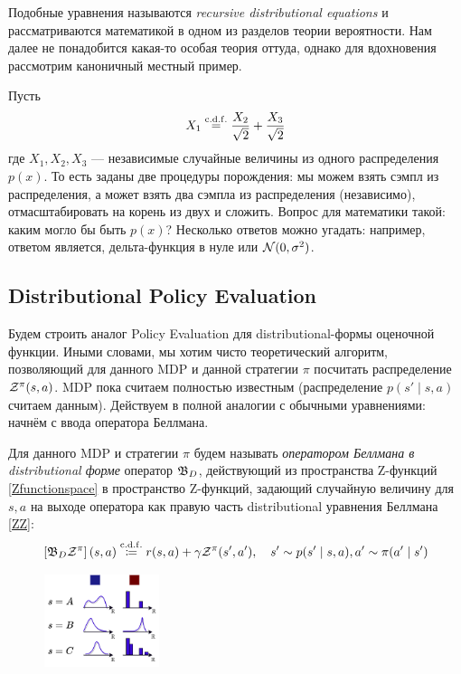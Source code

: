 Подобные уравнения называются \emph{recursive distributional equations} и рассматриваются математикой в одном из разделов теории вероятности. Нам далее не понадобится какая-то особая теория оттуда, однако для вдохновения рассмотрим каноничный местный пример. 
\begin{example}
Пусть
$$X_1 \mathrel{\stackrel{\mathrm{c.d.f.}}=} \frac{X_2}{\sqrt{2}} + \frac{X_3}{\sqrt{2}}$$
где $X_1, X_2, X_3$ --- независимые случайные величины из одного распределения $p(x)$. То есть заданы две процедуры порождения: мы можем взять сэмпл из распределения, а может взять два сэмпла из распределения (независимо), отмасштабировать на корень из двух и сложить. Вопрос для математики такой: каким могло бы быть $p(x)$? Несколько ответов можно угадать: например, ответом является, дельта-функция в нуле или $\mathcal{N}(0, \sigma^2)$.
\end{example}

\subsection{Distributional Policy Evaluation}

Будем строить аналог Policy Evaluation для distributional-формы оценочной функции. Иными словами, мы хотим чисто теоретический алгоритм, позволяющий для данного MDP и данной стратегии $\pi$ посчитать распределение $\mathcal{Z}^\pi(s, a)$. MDP пока считаем полностью известным (распределение $p(s' \mid s, a)$ считаем данным). Действуем в полной аналогии с обычными уравнениями: начнём с ввода оператора Беллмана.

\begin{definition}
Для данного MDP и стратегии $\pi$ будем называть \emph{оператором Беллмана в distributional форме} оператор $\mathfrak{B}_D$, действующий из пространства Z-функций \eqref{Zfunctionspace} в пространство Z-функций, задающий случайную величину для $s, a$ на выходе оператора как правую часть distributional уравнения Беллмана \eqref{ZZ}:
$$\left[\mathfrak{B}_D \mathcal{Z}^\pi\right](s, a) \mathrel{\stackrel{\mathrm{c.d.f.}}\coloneqq} r(s, a) + \gamma \mathcal{Z}^\pi(s', a'), \quad s' \sim p(s' \mid s, a), a' \sim \pi(a' \mid s')$$
\end{definition}

\begin{figure}
\vspace{-0.5cm}
\centering
\includegraphics[width=0.3\textwidth]{Images/DistributionalTable.png}
\vspace{-0.9cm}
\end{figure}

